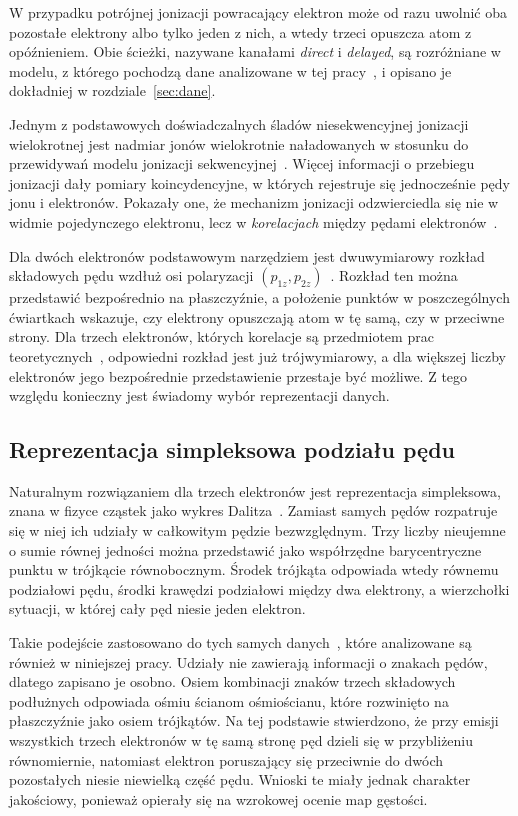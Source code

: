 \documentclass[12pt,a4paper]{article}
\begin{document}
W przypadku potrójnej jonizacji powracający elektron może od razu
uwolnić oba pozostałe elektrony albo tylko jeden z nich, a wtedy trzeci
opuszcza atom z opóźnieniem. Obie ścieżki, nazywane kanałami
\emph{direct} i \emph{delayed}, są rozróżniane w modelu, z którego
pochodzą dane analizowane w tej pracy~\cite{Emmanouilidou2023}, i
opisano je dokładniej w rozdziale~\ref{sec:dane}.

Jednym z podstawowych doświadczalnych śladów niesekwencyjnej jonizacji
wielokrotnej jest nadmiar jonów wielokrotnie naładowanych w stosunku do
przewidywań modelu jonizacji sekwencyjnej~\cite{LHuillier1983,BeckerRottke2008}.
Więcej informacji o przebiegu jonizacji dały pomiary koincydencyjne,
w których rejestruje się jednocześnie pędy jonu i elektronów. Pokazały
one, że mechanizm jonizacji odzwierciedla się nie w widmie pojedynczego
elektronu, lecz w \emph{korelacjach} między pędami
elektronów~\cite{Moshammer2000,Rudenko2004,Rudenko2007}.


Dla dwóch elektronów podstawowym narzędziem jest dwuwymiarowy rozkład
składowych pędu wzdłuż osi polaryzacji
\((p_{1z},p_{2z})\)~\cite{Staudte2007,Rudenko2007}. Rozkład ten można
przedstawić bezpośrednio na płaszczyźnie, a położenie punktów
w poszczególnych ćwiartkach wskazuje, czy elektrony opuszczają atom
w tę samą, czy w przeciwne strony. Dla trzech elektronów, których
korelacje są przedmiotem prac teoretycznych~\cite{Thiede2018,Efimov2021},
odpowiedni rozkład jest już trójwymiarowy, a dla większej liczby
elektronów jego bezpośrednie przedstawienie przestaje być możliwe.
Z tego względu konieczny jest świadomy wybór reprezentacji danych.

\subsection{Reprezentacja simpleksowa podziału pędu}

Naturalnym rozwiązaniem dla trzech elektronów jest reprezentacja
simpleksowa, znana w fizyce cząstek jako wykres
Dalitza~\cite{Dalitz1953}. Zamiast samych pędów rozpatruje się w niej
ich udziały w całkowitym pędzie bezwzględnym. Trzy liczby nieujemne
o sumie równej jedności można przedstawić jako współrzędne
barycentryczne punktu w trójkącie równobocznym. Środek trójkąta
odpowiada wtedy równemu podziałowi pędu, środki krawędzi podziałowi
między dwa elektrony, a wierzchołki sytuacji, w której cały pęd niesie
jeden elektron.

Takie podejście zastosowano do tych
samych danych~\cite{Ojczenasz2023}, które analizowane są również w niniejszej pracy. Udziały nie
zawierają informacji o znakach pędów, dlatego zapisano je osobno. Osiem
kombinacji znaków trzech składowych podłużnych odpowiada ośmiu ścianom
ośmiościanu, które rozwinięto na płaszczyźnie jako osiem trójkątów. Na
tej podstawie stwierdzono, że przy emisji wszystkich trzech elektronów
w tę samą stronę pęd dzieli się w przybliżeniu równomiernie, natomiast
elektron poruszający się przeciwnie do dwóch pozostałych niesie
niewielką część pędu. Wnioski te miały jednak charakter jakościowy,
ponieważ opierały się na wzrokowej ocenie map gęstości.
\end{document}
